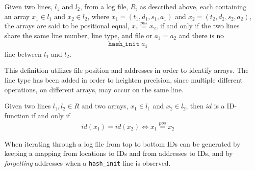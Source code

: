 \begin{definition}
Given two lines, $l_1$ and $l_2$, from a log file, $R$, as described above, each containing an array $x_1\in l_1$ and $x_2\in l_2$, where $x_1 = (t_1,d_1,s_1,a_1)$ and $x_2 = (t_2,d_2,s_2,a_2)$, the arrays are said to be positional equal, $x_1\stackrel{pos}{=} x_2$, if and only if the two lines share the same line number, line type, and file or $a_1 = a_2$ and there is no 
\begin{align*}
\texttt{hash\_init}\;a_1
\end{align*}
line between $l_1$ and $l_2$.
\end{definition}

This definition utilizes file position and addresses in order to identify arrays. The line type has been added in order to heighten precision, since multiple different operations, on different arrays, may occur on the same line. 

\begin{definition}
Given two lines $l_1, l_2\in R$ and two arrays, $x_1\in l_1$ and $x_2 \in l_2$, then $id$ is a ID-function if and only if
\begin{align*}
    id(x_1) = id(x_2) \Leftrightarrow x_1 \stackrel{pos}{=} x_2
\end{align*}
\end{definition}

When iterating through a log file from top to bottom IDs can be generated by keeping a mapping from locations to IDs and from addresses to IDs, and by \emph{forgetting} addresses when a \texttt{hash\_init} line is observed.